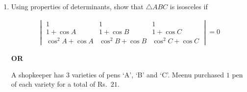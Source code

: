 \documentclass[12pt]{article}
\begin{document}
\begin{enumerate}
\item[(26)] Using properties of determinants, show that $\triangle ABC$ is isosceles if

\begin{align*}
\begin{vmatrix}
1 & 1 & 1 \\
1+\cos A & 1+\cos B & 1+\cos C \\
\cos^2 A+\cos A &
\cos^2 B+\cos B &
\cos^2 C+\cos C
\end{vmatrix}
=0
\end{align*}

\textbf{OR}

A shopkeeper has $3$ varieties of pens `A', `B' and `C'. Meenu purchased $1$ pen of each variety for a total of Rs.\ $21$.

\end{enumerate}
\end{document}
